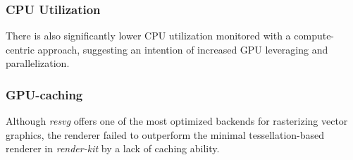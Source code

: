 \subsubsection{CPU Utilization} There is also significantly lower CPU utilization monitored with a compute-centric approach, suggesting an intention of increased GPU leveraging and parallelization.

\subsubsection{GPU-caching} Although \textit{resvg} offers one of the most optimized backends for rasterizing vector graphics, the renderer failed to outperform the minimal tessellation-based renderer in \textit{render-kit} by a lack of caching ability.
